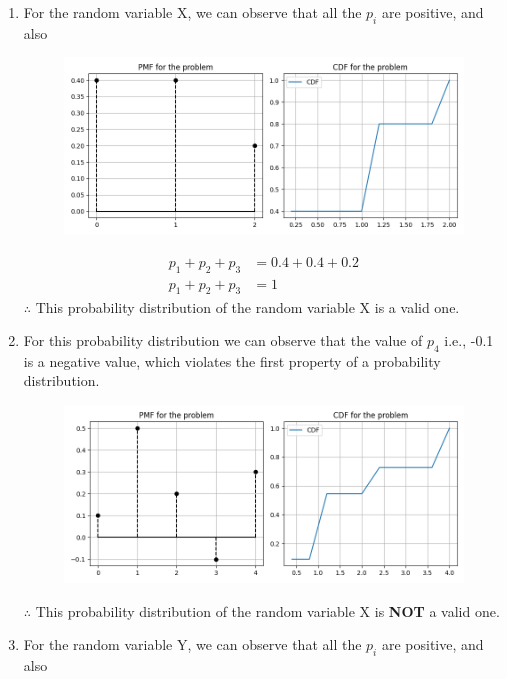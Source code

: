 \documentclass[journal,12pt,twocolumn]{IEEEtran}
\begin{document}
\begin{enumerate}[label=(\roman*)]
    \item For the random variable X, we can observe that all the $p_i$ are positive, and also
    \begin{figure}[htb] 
		\centering
		\includegraphics[width=\columnwidth]{Figure_1}
	\end{figure}
    \begin{align}
    p_1 + p_2 + p_3 &= 0.4 + 0.4 + 0.2\\ 
   p_1 + p_2 + p_3 &= 1
    \end{align}
    $\therefore$ This probability distribution of the random variable X is a valid one.
	      \item For this probability distribution we can observe that the value of $p_4$ i.e., -0.1 is a negative value, which violates the first property of a probability distribution.\\
	      \begin{figure}[htb] 
		\centering
		\includegraphics[width=\columnwidth]{Figure_2}
	\end{figure}
	      $\therefore$ This probability distribution of the random variable X is \textbf{NOT} a valid one.\\
	      \item For the random variable Y, we can observe that all the $p_i$ are positive, and also

\end{enumerate}
\end{document}
